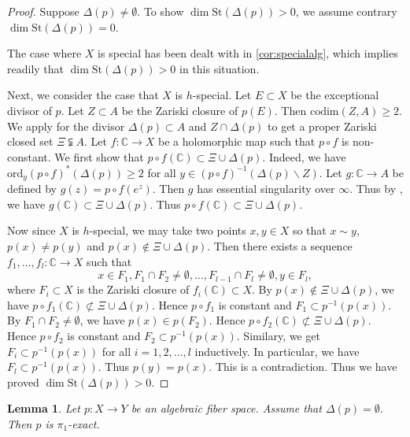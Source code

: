 \documentclass[11pt,english]{smfart}
\theoremstyle{plain}
\newtheorem{lem}[thm]{Lemma}
\theoremstyle{definition}
\theoremstyle{remark}
\numberwithin{equation}{subsection}
\theoremstyle{plain}
\begin{document}
\begin{proof}
Suppose $\Delta (p)\not= \emptyset$.
To show $\dim \mathrm{St}(\Delta (p))> 0$, we assume contrary $\dim \mathrm{St}(\Delta (p))= 0$.
 

The case where \(X\) is special has been dealt with in \cref{cor:specialalg}, which implies readily that $\dim \mathrm{St}(\Delta (p))> 0$ in this situation. 

Next, we consider the case that $X$ is $h$-special.
Let $E\subset X$ be the exceptional divisor of $p$.
Let $Z\subset A$ be the Zariski closure of $p(E)$.
Then $\mathrm{codim}(Z,A)\geq 2$.
We apply \cite[Proposition 10.9]{CDY25} for the divisor $\Delta(p)\subset A$ and $Z\cap\Delta(p)$ to get a proper Zariski closed set $\Xi\subsetneqq A$.
Let $f:\mathbb C\to X$ be a holomorphic map such that $p\circ f$ is non-constant.
We first show that $p\circ f(\mathbb C)\subset \Xi\cup \Delta(p)$.
Indeed, we have $\mathrm{ord}_y(p\circ f)^{*}(\Delta(p))\geq 2$ for all $y\in (p\circ  f)^{-1}(\Delta(p)\backslash Z)$.
Let $g:\mathbb C\to A$ be defined by $g(z)=p\circ f(e^z)$.
Then $g$ has essential singularity over $\infty$.
Thus by \cite[Proposition 10.9]{CDY25}, we have $g(\mathbb C)\subset \Xi\cup \Delta(p)$.
Thus $p\circ f(\mathbb C)\subset \Xi\cup \Delta(p)$.


Now since $X$ is $h$-special, we may take two points $x,y\in X$ so that $x\sim y$, $p(x)\not=p(y)$ and $p(x)\not\in \Xi\cup \Delta(p)$.
Then there exists a sequence $f_1,\ldots,f_l:\mathbb C\to X$ such that 
$$x\in F_1, F_1\cap F_2\not=\emptyset,\ldots,F_{l-1}\cap F_l\not=\emptyset, y\in F_l,$$
where $F_i\subset X$ is the Zariski closure of $f_i(\mathbb C)\subset X$.
By $p(x)\not\in \Xi\cup \Delta(p)$, we have $p\circ f_1(\mathbb C)\not\subset  \Xi\cup \Delta(p)$.
Hence $p\circ f_1$ is constant and $F_1\subset  p^{-1}(p(x))$.
By $F_1\cap F_2\not=\emptyset$, we have $p(x)\in p(F_2)$.
Hence $p\circ f_2(\mathbb C)\not\subset  \Xi\cup \Delta(p)$.
Hence $p\circ f_2$ is constant and $F_2\subset  p^{-1}(p(x))$.
Similary, we get $F_i\subset  p^{-1}(p(x))$ for all $i=1,2,\ldots,l$ inductively.
In particular, we have $F_l\subset  p^{-1}(p(x))$.
Thus $p(y)=p(x)$.
This is a contradiction.
Thus we have proved $\dim \mathrm{St}(\Delta (p))> 0$.
\end{proof}




\begin{lem}\label{lem:4}
Let $p:X\to Y$ be an algebraic fiber space. Assume that $\Delta (p)=\emptyset$. Then $p$ is $\pi _1$-exact. 
\end{lem}
\end{document}

